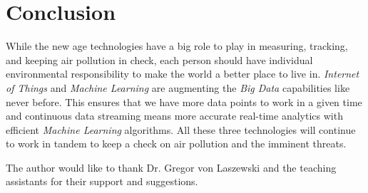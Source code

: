 \documentclass[sigconf]{acmart}
\begin{document}
\section{Conclusion}
While the new age technologies have a big role to play in measuring, tracking, and keeping air pollution in check, each person should have individual environmental responsibility to make the world a better place to live in. {\em Internet of Things} and {\em Machine Learning} are augmenting the {\em Big Data} capabilities like never before. This ensures that we have more data points to work in a given time and continuous data streaming means more accurate real-time analytics with efficient {\em Machine Learning} algorithms. All these three technologies will continue to work in tandem to keep a check on air pollution and the imminent threats.

\begin{acks}

The author would like to thank Dr. Gregor von Laszewski and the teaching assistants for their support and suggestions.

\end{acks}


 
\end{document}
